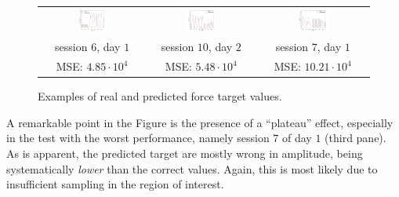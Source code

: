 \begin{figure}[!ht] \centering
  \begin{tabular}{ccc}
    \includegraphics[width=0.30\textwidth]{figs/fig_regression1} &
    \includegraphics[width=0.30\textwidth]{figs/fig_regression2} &
    \includegraphics[width=0.30\textwidth]{figs/fig_regression3} \\
    session $6$, day $1$ & session $10$, day $2$ & session $7$, day $1$ \\
    MSE: $4.85\cdot 10^4$ & MSE: $5.48\cdot 10^4$ & MSE: $10.21\cdot 10^4$ \\
  \end{tabular}
  \caption{Examples of real and predicted force target values.}
  \label{fig:regression}
\end{figure}

A remarkable point in the Figure is the presence of a ``plateau''
effect, especially in the test with the worst performance, namely
session $7$ of day $1$ (third pane). As is apparent, the predicted
target are mostly wrong in amplitude, being systematically
\emph{lower} than the correct values. Again, this is most likely due
to insufficient sampling in the region of interest.
